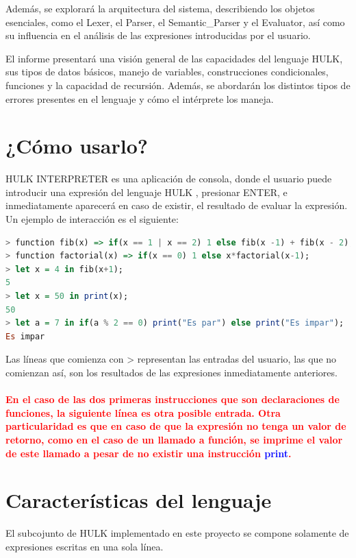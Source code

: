 \documentclass[a4paper, 12pt]{article}
\begin{document}
Además, se explorará la arquitectura del sistema, describiendo los objetos esenciales, como el Lexer, el Parser, el Semantic\_Parser y el Evaluator, así como su influencia en el análisis de las expresiones introducidas por el usuario.

El informe presentará una visión general de las capacidades del lenguaje HULK, sus tipos de datos básicos, manejo de variables, construcciones condicionales, funciones y la capacidad de recursión. Además, se abordarán los distintos tipos de errores presentes en el lenguaje y cómo el intérprete los maneja.


\newpage
\section{¿Cómo usarlo?}

HULK INTERPRETER  es una aplicación de consola, donde el usuario puede introducir una expresión del lenguaje HULK , presionar ENTER, e inmediatamente aparecerá en caso de existir, el resultado de evaluar la expresión. Un ejemplo de interacción es el siguiente:

\begin{lstlisting}[language= Haskell]
> function fib(x) => if(x == 1 | x == 2) 1 else fib(x -1) + fib(x - 2);  
> function factorial(x) => if(x == 0) 1 else x*factorial(x-1);  
> let x = 4 in fib(x+1);
5
> let x = 50 in print(x);
50
> let a = 7 in if(a % 2 == 0) print("Es par") else print("Es impar");
Es impar
\end{lstlisting}

Las líneas que comienza con >   representan las entradas del usuario, las que no comienzan así, son los resultados de las expresiones inmediatamente anteriores.
\paragraph{\textcolor{red}{En el caso de las dos primeras instrucciones que son declaraciones de funciones, la siguiente línea es otra posible entrada. Otra particularidad es que en caso de que la expresión no tenga un valor de retorno, como en el caso de un llamado a función, se imprime el valor de este llamado a pesar de no existir una instrucción \textcolor{blue}{print}.}}



\newpage
\section{Características del lenguaje}\label{sec;base}
El subcojunto de HULK implementado en este proyecto se compone solamente de expresiones escritas en una sola línea.
\end{document}
